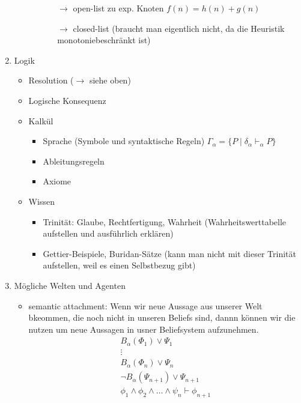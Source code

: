 \documentclass[runningheads,deutsch]{llncs}
\begin{document}
\begin{enumerate}
\begin{enumerate}
\begin{itemize}
\begin{itemize}
                \item[$\rightarrow$] open-list zu exp. Knoten $f(n) = h(n) + g(n)$ 
                \item[$\rightarrow$] closed-list (braucht man eigentlich nicht, da die Heuristik monotoniebeschränkt ist)
            \end{itemize}
        \end{itemize}
    \end{enumerate}
    \item Logik
    \begin{itemize}
        \item Resolution ($\rightarrow$ siehe oben)
        \item Logische Konsequenz
        \item Kalkül
        \begin{itemize}
            \item Sprache (Symbole und syntaktische Regeln) $\Gamma_\alpha= \{P \; |\; \delta_\alpha \vdash_\alpha P\}$
            \item Ableitungsregeln
            \item Axiome
        \end{itemize}
        \item Wissen
        \begin{itemize}
            \item Trinität: Glaube, Rechtfertigung, Wahrheit (Wahrheitswerttabelle aufstellen und ausführlich erklären)
            \item Gettier-Beispiele, Buridan-Sätze (kann man nicht mit dieser Trinität aufstellen, weil es einen Selbstbezug gibt)
        \end{itemize}
    \end{itemize}
    \item Mögliche Welten und Agenten
    \begin{itemize}
        \item semantic attachment: Wenn wir neue Aussage aus unserer Welt bkeommen, die noch nicht in unseren Beliefs sind, dannn können wir die nutzen um neue Aussagen in usner Beliefsystem aufzunehmen.
        \begin{align*}
            B_\alpha(\Phi_1) \lor \Psi_1 \\
            \vdots \\
            B_\alpha(\Phi_n) \lor \Psi_n \\
            \lnot B_\alpha(\Psi_{n+1}) \lor \Psi_{n+1} \\
            \phi_1 \land \phi_2 \land \dots \land \psi_n \vdash \phi_{n+1} \\

\end{align*}
\end{itemize}
\end{enumerate}
\end{document}
